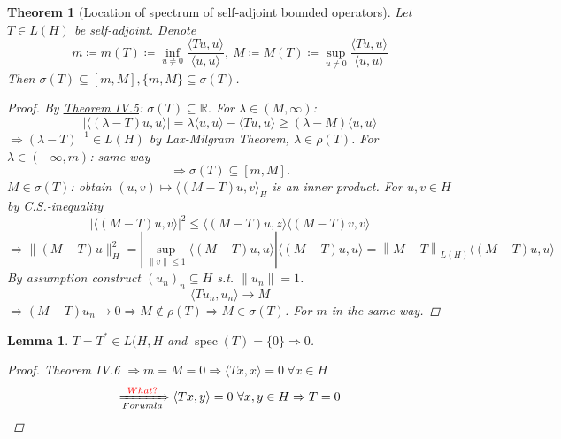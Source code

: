 \documentclass[12pt]{extreport} %
\newcommand{\R}{\mathbb{R}}
\theoremstyle{named}
\theoremstyle{nnamed}
\theoremstyle{itshape}
\newtheorem{theorem}{Theorem}  \counterwithin{theorem}{chapter}
\newtheorem{lemma}{Lemma}  \counterwithin{lemma}{chapter}
\theoremstyle{normal}
\begin{document}
\begin{theorem}[Location of spectrum of self-adjoint bounded operators]
	Let $T \in L(H)$ be self-adjoint. Denote
	$$ m \coloneqq m(T) \coloneqq \inf_{u \neq 0} \frac{\langle Tu, u \rangle}{\langle u, u \rangle}, ~ M \coloneqq M(T) \coloneqq \sup_{u \neq 0} \frac{\langle Tu, u \rangle}{\langle u, u \rangle} $$
	Then $\sigma(T) \subseteq [m, M], \{ m, M \} \subseteq \sigma(T)$.
	
	\begin{proof}
		By \hyperref[thm:iv.5]{Theorem IV.5}: $\sigma(T) \subseteq \R$. For $\lambda \in (M, \infty)$:
		$$ \left| \langle \left( \lambda - T \right) u, u \rangle \right| = \lambda \langle u, u \rangle - \langle T u, u \rangle \geq \left( \lambda - M \right) \langle u, u \rangle $$
	$\Rightarrow \left( \lambda - T \right)^{-1} \in L(H)$ by Lax-Milgram Theorem, $\lambda \in \rho(T)$. For $\lambda \in (-\infty, m)$: same way 
	$$\Rightarrow \sigma(T) \subseteq [m, M]. $$
		$M \in \sigma(T)$: obtain $(u, v) \mapsto \langle (M - T) u, v \rangle_H$ is an inner product. For $u,v \in H$ by C.S.-inequality
		$$ \left| \langle \left( M - T \right) u, v \rangle \right|^2 \leq \langle \left( M - T \right) u, z \rangle \langle \left(M - T \right)v, v \rangle $$
		$$ \Rightarrow \| \left( M - T \right) u \|_H^2 = \left| \sup_{\| v \| \leq 1} \langle \left(M-T\right)u,u\rangle \right| \langle \left(M - T\right)u, u \rangle = \left\| M - T \right\|_{L(H)} \langle \left(M - T \right) u, u \rangle $$
		By assumption construct $(u_n)_n \subseteq H$ s.t. $\| u_n \| = 1$.
		$$ \langle T u_n, u_n \rangle \rightarrow M $$
		$\Rightarrow \left( M - T \right) u_n \rightarrow 0 \Rightarrow M \notin \rho(T) \Rightarrow M \in \sigma(T)$. For $m$ in the same way.
	\end{proof}
\end{theorem}

\begin{lemma}
	$T = T^* \in L(H, H$ and $\operatorname{spec}(T) = \{ 0 \} \Rightarrow 0$.
	
	\begin{proof}
		Theorem IV.6 $\Rightarrow m = M = 0 \Rightarrow \langle Tx, x \rangle = 0 ~ \forall x \in H$
		$$ \xRightarrow[Forumla]{{\color{red}What?}} \langle Tx, y \rangle = 0 ~\forall x, y \in H \Rightarrow T = 0 $$ %
	\end{proof}	
\end{lemma}
\end{document}

